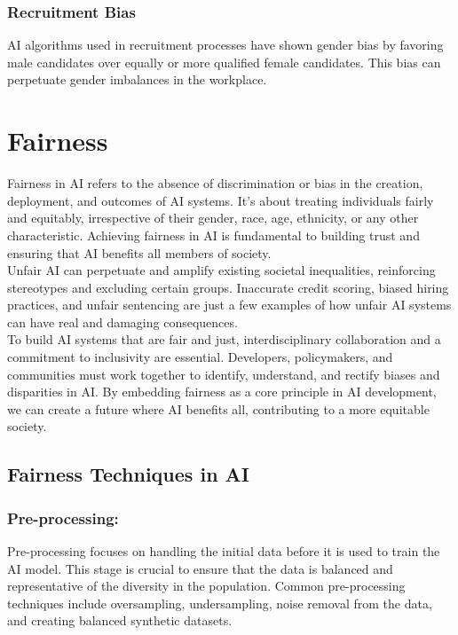 \documentclass[12pt,a4paper,openright,twoside]{book}
\begin{document}
\subsubsection{Recruitment Bias}
AI algorithms used in recruitment processes have shown gender bias by favoring male candidates over equally or more qualified female candidates. This bias can perpetuate gender imbalances in the workplace.

\section{Fairness}
Fairness in AI refers to the absence of discrimination or bias in the creation, deployment, and outcomes of AI systems. It's about treating individuals fairly and equitably, irrespective of their gender, race, age, ethnicity, or any other characteristic. Achieving fairness in AI is fundamental to building trust and ensuring that AI benefits all members of society. \\
Unfair AI can perpetuate and amplify existing societal inequalities, reinforcing stereotypes and excluding certain groups. Inaccurate credit scoring, biased hiring practices, and unfair sentencing are just a few examples of how unfair AI systems can have real and damaging consequences. \\
To build AI systems that are fair and just, interdisciplinary collaboration and a commitment to inclusivity are essential. Developers, policymakers, and communities must work together to identify, understand, and rectify biases and disparities in AI. By embedding fairness as a core principle in AI development, we can create a future where AI benefits all, contributing to a more equitable society. \\

\subsection{Fairness Techniques in AI}

\subsubsection{Pre-processing:}
Pre-processing focuses on handling the initial data before it is used to train the AI model. This stage is crucial to ensure that the data is balanced and representative of the diversity in the population. Common pre-processing techniques include oversampling, undersampling, noise removal from the data, and creating balanced synthetic datasets.
\end{document}
